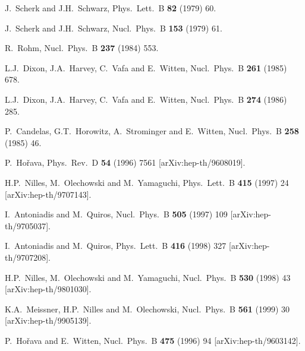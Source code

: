 \documentclass[a4paper,12pt]{article}
\begin{document}
\vspace{2cm}
\begin{thebibliography}{99}

J.~Scherk and J.H.~Schwarz,
Phys.\ Lett.\ B {\bf 82} (1979) 60.

J.~Scherk and J.H.~Schwarz,
Nucl.\ Phys.\ B {\bf 153} (1979) 61.

R.~Rohm,
Nucl.\ Phys.\ B {\bf 237} (1984) 553.

L.J.~Dixon, J.A.~Harvey, C.~Vafa and E.~Witten,
Nucl.\ Phys.\ B {\bf 261} (1985) 678.

L.J.~Dixon, J.A.~Harvey, C.~Vafa and E.~Witten,
Nucl.\ Phys.\ B {\bf 274} (1986) 285.

P.~Candelas, G.T.~Horowitz, A.~Strominger and E.~Witten,
Nucl.\ Phys.\ B {\bf 258} (1985) 46.

P.~Ho\v rava,
Phys.\ Rev.\ D {\bf 54} (1996) 7561
[arXiv:hep-th/9608019].

H.P.~Nilles, M.~Olechowski and M.~Yamaguchi,
Phys.\ Lett.\ B {\bf 415} (1997) 24
[arXiv:hep-th/9707143].

I.~Antoniadis and M.~Quiros,
Nucl.\ Phys.\ B {\bf 505} (1997) 109
[arXiv:hep-th/9705037].

I.~Antoniadis and M.~Quiros,
Phys.\ Lett.\ B {\bf 416} (1998) 327
[arXiv:hep-th/9707208].

H.P.~Nilles, M.~Olechowski and M.~Yamaguchi,
Nucl.\ Phys.\ B {\bf 530} (1998) 43
[arXiv:hep-th/9801030].

K.A.~Meissner, H.P.~Nilles and M.~Olechowski,
Nucl.\ Phys.\ B {\bf 561} (1999) 30
[arXiv:hep-th/9905139].

P.~Ho\v rava and E.~Witten,
Nucl.\ Phys.\ B {\bf 475} (1996) 94
[arXiv:hep-th/9603142].


\end{thebibliography}
\end{document}
